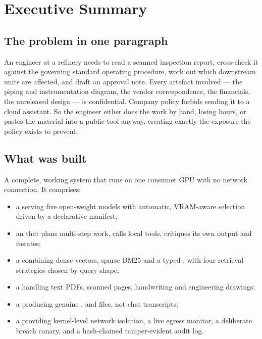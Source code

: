 \section{Executive Summary}

\subsection{The problem in one paragraph}

An engineer at a refinery needs to read a scanned inspection report, cross-check
it against the governing standard operating procedure, work out which downstream
units are affected, and draft an approval note. Every artefact involved --- the
piping and instrumentation diagram, the vendor correspondence, the financials,
the unreleased design --- is confidential. Company policy forbids sending it to
a cloud assistant. So the engineer either does the work by hand, losing hours,
or pastes the material into a public tool anyway, creating exactly the exposure
the policy exists to prevent.

\subsection{What was built}

A complete, working system that runs on one consumer GPU with no network
connection. It comprises:

\begin{itemize}
\item a  serving five open-weight models with automatic,
      VRAM-aware selection driven by a declarative manifest;
\item an  that plans multi-step work, calls local tools, critiques
      its own output and iterates;
\item a  combining dense vectors, sparse BM25 and a
      typed , with four retrieval strategies chosen by
      query shape;
\item a  handling text PDFs, scanned pages,
      handwriting and engineering drawings;
\item a  producing genuine ,
       and  files, not chat transcripts;
\item a  providing kernel-level network isolation,
      a live egress monitor, a deliberate breach canary, and a hash-chained
      tamper-evident audit log.
\end{itemize}

